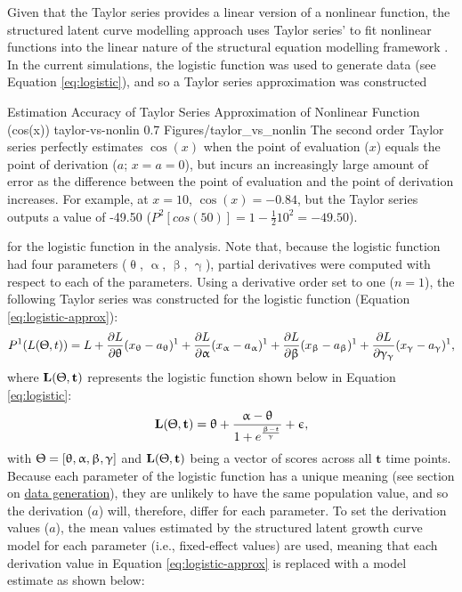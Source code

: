 \documentclass[
12pt, %
twoside,
english]{guelphthesis}
\begin{document}
Given that the Taylor series provides a linear version of a nonlinear function, the structured latent curve modelling approach uses Taylor series' to fit nonlinear functions into the linear nature of the structural equation modelling framework \autocite{browne1991,browne1993}. In the current simulations, the logistic function was used to generate data (see Equation \ref{eq:logistic}), and so a Taylor series approximation was constructed
\begin{apaFigure}
[portrait]
[samepage]
[0cm]
{Estimation Accuracy of Taylor Series Approximation of Nonlinear Function (cos(x))}
{taylor-vs-nonlin}
{0.7}
{Figures/taylor_vs_nonlin}
{The second order Taylor series perfectly estimates $\cos(x)$ when the point of evaluation ($x$) equals the point of derivation ($a$; $x = a = 0$), but incurs an increasingly large amount of error as the difference between the point of evaluation and the point of derivation increases. For example, at $x = 10$, $\cos(x) = -0.84$, but the Taylor series outputs a value of -49.50 ($P^2[cos(50)] = 1- \frac{1}{2}10^2 = -49.50$).}
\end{apaFigure}
\noindent for the logistic function in the analysis. Note that, because the logistic function had four parameters (\(\uptheta\), \(\upalpha\), \(\upbeta\), \(\upgamma\)), partial derivatives were computed with respect to each of the parameters. Using a derivative order set to one
(\(n = 1\)), the following Taylor series was constructed for the logistic
function (Equation \ref{eq:logistic-approx}):
\begin{align}
 P^1(L(\Uptheta, t)) = L + \frac{\partial L}{\partial \uptheta}(x_{\uptheta}-a_{\uptheta})^1 + \frac{\partial L}{\partial \upalpha}(x_{\upalpha}-a_{\upalpha})^1 + \frac{\partial L}{\partial \upbeta}(x_{\upbeta}-a_{\upbeta})^1 + \frac{\partial L}{\partial \upgamma_{\upgamma}}(x_{\upgamma}-a_{\upgamma})^1, 
\label{eq:logistic-approx}
\end{align}
\noindent where \(\mathbf{L(\Uptheta, t)}\) represents the logistic function shown below in
Equation \ref{eq:logistic}:
\begin{align}
  \mathbf{L(\Uptheta, t)} = \uptheta + \frac{\upalpha - \uptheta}{{1 + e^\frac{\upbeta - t}{\upgamma}}} + \upepsilon, 
\label{eq:logistic}
\end{align}
\noindent with \(\mathbf{\Uptheta} = [\uptheta, \upalpha, \upbeta, \upgamma]\) and \(\mathbf{L(\Uptheta, t)}\) being a vector of scores across all \(\mathbf{t}\) time points. Because each parameter of the logistic function has a unique meaning (see section on \protect\hyperlink{data-generation}{data generation}), they are unlikely to have the same population value, and so the derivation (\(a\)) will, therefore, differ for each parameter. To set the derivation values (\(a\)), the mean values estimated by the structured latent growth curve model for each parameter (i.e., fixed-effect values) are used, meaning that each derivation value in Equation \ref{eq:logistic-approx} is replaced with a model estimate as shown below:
\end{document}
